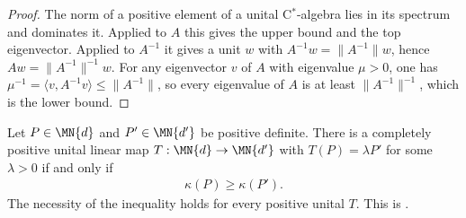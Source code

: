 \begin{proof}\leanok
    The norm of a positive element of a unital C$^*$-algebra lies in its
    spectrum and dominates it. Applied to $A$ this gives the upper bound and
    the top eigenvector. Applied to $A^{-1}$ it gives a unit $w$ with
    $A^{-1}w=\lVert A^{-1}\rVert w$, hence $Aw=\lVert A^{-1}\rVert^{-1}w$.
    For any eigenvector $v$ of $A$ with eigenvalue $\mu>0$, one has
    $\mu^{-1}=\langle v,A^{-1}v\rangle\le\lVert A^{-1}\rVert$, so every
    eigenvalue of $A$ is at least $\lVert A^{-1}\rVert^{-1}$, which is the
    lower bound.
\end{proof}

\begin{theorem}
    \label{thm:cp_unital_interpolation_condition_number}
    \leanok
    Let $P\in\MN{d}$ and $P'\in\MN{d'}$ be positive definite. There is a
    completely positive unital linear map $T:\MN{d}\to\MN{d'}$ with
    $T(P)=\lambda P'$ for some $\lambda>0$ if and only if
    \begin{align}
        \kappa(P)\ge\kappa(P').
    \end{align}
    The necessity of the inequality holds for every positive unital $T$.
    This is \cite[Chapter~8, Equations~(8.93)--(8.95)]{Wolf2012Quantum}.
\end{theorem}


